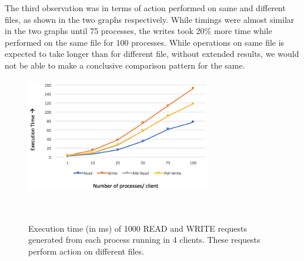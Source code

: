 The third observation was in terms of action performed on same and different files, as shown in the two graphs respectively. While timings were almost similar in the two graphs until 75 processes, the writes took 20\% more time while performed on the same file for 100 processes. While operations on same file is expected to take longer than for different file, without extended results, we would not be able to make a conclusive comparison pattern for the same. 


\begin{figure}[h]
\centering
\includegraphics[height=2in, width=3.2in]{images/F-VHC-DF.png}
\caption{Execution time (in ms) of 1000 READ and WRITE requests generated from each process running in 4 clients. These requests perform action on different files.}~\label{fig:figure6}
\end{figure}










